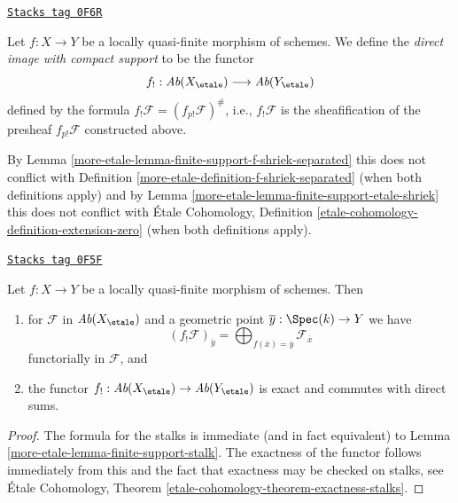 \begin{definition}
\label{more-etale-definition-f-shriek-lqf}
\href{https://stacks.math.columbia.edu/tag/0F6R}{\texttt{Stacks tag 0F6R}}

Let $f : X \to Y$ be a locally quasi-finite morphism of schemes.
We define the {\it direct image with compact support} to be the
functor
$$
f_! : \textit{Ab}(X_\etale) \longrightarrow \textit{Ab}(Y_\etale)
$$
defined by the formula $f_!\mathcal{F} = (f_{p!}\mathcal{F})^\#$,
i.e., $f_!\mathcal{F}$ is the sheafification of the presheaf
$f_{p!}\mathcal{F}$ constructed above.
\end{definition}

By Lemma \ref{more-etale-lemma-finite-support-f-shriek-separated}
this does not conflict with Definition \ref{more-etale-definition-f-shriek-separated}
(when both definitions apply) and by
Lemma \ref{more-etale-lemma-finite-support-etale-shriek}
this does not conflict with
\'Etale Cohomology, Definition \ref{etale-cohomology-definition-extension-zero}
(when both definitions apply).

\begin{lemma}
\label{more-etale-lemma-lqf-f-shriek-stalk}
\href{https://stacks.math.columbia.edu/tag/0F5F}{\texttt{Stacks tag 0F5F}}

Let $f : X \to Y$ be a locally quasi-finite morphism of schemes. Then
\begin{enumerate}
\item for $\mathcal{F}$ in $\textit{Ab}(X_\etale)$ and a geometric
point $\overline{y} : \Spec(k) \to Y$ we have
$$
(f_!\mathcal{F})_{\overline{y}} =
\bigoplus\nolimits_{f(\overline{x}) = \overline{y}} \mathcal{F}_{\overline{x}}
$$
functorially in $\mathcal{F}$, and
\item the functor $f_! : \textit{Ab}(X_\etale) \to \textit{Ab}(Y_\etale)$
is exact and commutes with direct sums.
\end{enumerate}
\end{lemma}

\begin{proof}
The formula for the stalks is immediate (and in fact equivalent) to
Lemma \ref{more-etale-lemma-finite-support-stalk}.
The exactness of the functor follows immediately from this
and the fact that exactness may be checked on stalks, see
\'Etale Cohomology, Theorem \ref{etale-cohomology-theorem-exactness-stalks}.
\end{proof}

